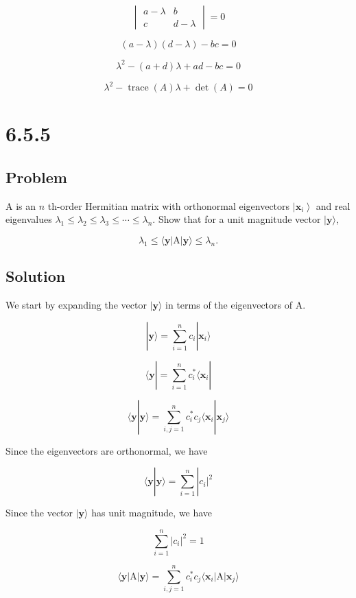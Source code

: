 \documentclass[12pt]{article}
\begin{document}
\[
    \begin{vmatrix}
        a - \lambda & b           \\
        c           & d - \lambda
    \end{vmatrix} = 0
\]

\[
    (a - \lambda)(d - \lambda) - bc = 0
\]

\[
    \lambda^2 - (a + d) \lambda + ad - bc = 0
\]

\[
    \lambda^2 - \operatorname{trace}(A) \lambda + \det(A) = 0
\]

\newpage
\section{6.5.5}

\subsection{Problem}

\(\mathrm{A}\) is an \(n\) th-order Hermitian matrix with orthonormal eigenvectors \(\left|\mathbf{x}_i\right\rangle \) and real eigenvalues \(\lambda_1 \leq \lambda_2 \leq \lambda_3 \leq \cdots \leq \lambda_n\). Show that for a unit magnitude vector \(|\mathbf{y}\rangle \),

\[
    \lambda_1 \leq\langle\mathbf{y}|\mathrm{A}| \mathbf{y}\rangle \leq \lambda_n .
\]

\subsection{Solution}

We start by expanding the vector \(|\mathbf{y}\rangle \) in terms of the eigenvectors of A.

\[
    |\mathbf{y}\rangle = \sum_{i=1}^{n} c_i |\mathbf{x}_i\rangle
\]

\[
    \langle\mathbf{y}| = \sum_{i=1}^{n} c_i^* \langle\mathbf{x}_i|
\]

\[
    \langle\mathbf{y}|\mathbf{y}\rangle = \sum_{i, j=1}^{n} c_i^* c_j \langle\mathbf{x}_i|\mathbf{x}_j\rangle
\]

Since the eigenvectors are orthonormal, we have

\[
    \langle\mathbf{y}|\mathbf{y}\rangle = \sum_{i=1}^{n} |c_i|^2
\]

Since the vector \(|\mathbf{y}\rangle \) has unit magnitude, we have

\[
    \sum_{i=1}^{n} |c_i|^2 = 1
\]

\[
    \langle\mathbf{y}|\mathrm{A}| \mathbf{y}\rangle = \sum_{i, j=1}^{n} c_i^* c_j \langle\mathbf{x}_i|\mathrm{A}| \mathbf{x}_j\rangle
\]
\end{document}
